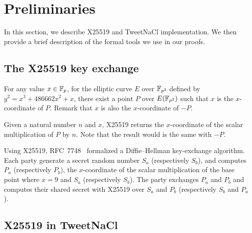 \section{Preliminaries}
\label{preliminaries}

In this section, we describe X25519 and TweetNaCl implementation.
We then provide a brief description of the formal tools we use in our proofs.

\subsection{The X25519 key exchange}
\label{preliminaries:A}


For any value $x \in \mathbb{F}_{p}$, for the elliptic curve $E$ over $\mathbb{F}_{p^2}$
defined by $y^2 = x^3 + 486662 x^2 + x$, there exist a point $P$ over $E(\mathbb{F}_{p^2})$
such that $x$ is the $x$-coordinate of $P$. Remark that $x$ is also the $x$-coordinate of $-P$.

Given a natural number $n$ and $x$, X25519 returns the $x$-coordinate of the
scalar multiplication of $P$ by $n$. Note that the result would is the same with $-P$.

Using X25519, RFC~7748~\cite{rfc7748} formalized a Diffie–Hellman key-exchange algorithm.
Each party generate a secret random number $S_a$ (respectively $S_b$), and computes $P_a$ (respectively $P_b$),
the $x$-coordinate of the scalar multiplication of the base point where $x = 9$ and $S_a$ (respectively $S_b$).
The party exchanges $P_a$ and $P_b$ and computes their shared secret with X25519
over $S_a$ and $P_b$ (respectively $S_b$ and $P_a$).

\subsection{X25519 in TweetNaCl}
\label{preliminaries:B}

